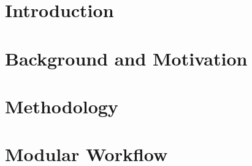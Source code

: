 \section{Introduction}

\section{Background and Motivation}

\section{Methodology}

\section{Modular Workflow}
